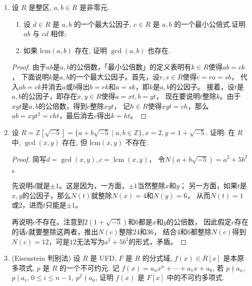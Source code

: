 \begin{enumerate}
\item 设 $ R $ 是整区, $ a, b \in R $ 是非零元.
\begin{enumerate}[label=(\arabic*)]
    \item 设 $ d \in R $ 是 $ a, b $ 的一个最大公因子, $ c \in R $ 是 $ a, b $ 的一个最小公倍式.证明 $ ab $ 与 $ cd $ 相伴;
    \item 如果 $ \mathrm{lcm}(a, b) $ 存在, 证明 $ \gcd(a, b) $ 也存在.
\end{enumerate}
\begin{proof}
    由于$ab$是$a,b$的公倍数，「最小公倍数」的定义表明有$k \in R$使得$ab=ck$，
    下面说明$k$是$a,b$的一个最大公因子。首先，设$r,s \in R$使得$c=ra=sb$，
    代入$ab=ck$并消去$a$或$b$得出$b=rk$和$a=sk$，即$k$是$a,b$的公因子。
    接着，设$t$是$a,b$的公因子，即存在$x,y \in R$使得$a=xt,b=yt$，
    现在要说明$t$整除$k$。由于$xyt$是$a,b$的公倍数，得到$c$整除$xyt$，
    记$h \in R$使得$xyt=ch$，那么$ab=xyt^2=cht$，最后消去$c$得出$k=ht$。
\end{proof}

\item 设 $ R = \mathbb{Z}[\sqrt{-5}] = \{a + b\sqrt{-5} \mid a, b \in \mathbb{Z}\}, x = 2, y = 1 + \sqrt{-5} $. 
证明: 在 $ R $ 中, $ \gcd(x, y) $ 存在, 但 $ \mathrm{lcm}(x, y) $ 不存在.
\begin{proof}
    简写$d=\operatorname{gcd}(x,y),c=\operatorname{lcm}(x,y)$，
    令$N(a+b\sqrt{-5})=a^2+5b^2$。
    
    先说明$d$就是$\pm1$。这是因为，一方面，$\pm1$当然整除$x$和$y$；
    另一方面，如果$t$是$x,y$的公因子，那么$N(t)$就整除$N(x)=4$和$N(y)=6$，
    从而$N(t)=1$或$2$，进而$t$只能是$\pm1$。
    
    再说明$c$不存在。注意到$2(1+\sqrt{-5})$和$6$都是$x$和$y$的公倍数，
    因此假定$c$存在的话$c$就要整除这两者，推出$N(c)$整除$24$和$36$，
    结合$4$和$6$都整除$N(c)$得到$N(c)=12$，可是$12$无法写为$a^2+5b^2$的形式，矛盾。
\end{proof}

\item (Eisenstein 判别法) 设 $ R $ 是 UFD, $ F $ 是 $ R $ 的分式域, $ f(x) \in R[x] $ 是本原多项式, $ p $ 是 $ R $ 的一个不可约元.
记 $ f(x) = a_n x^n + \cdots + a_1 x + a_0 $, 若 $ p \nmid a_n $, $ p \mid a_i $, $ 0 \leqslant i \leqslant n-1 $, $ p^2 \nmid a_0 $, 证明 $ f(x) $ 是 $ F[x] $ 中的不可约多项式.


\end{enumerate}
